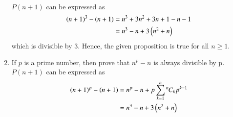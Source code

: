 \begin{enumerate}[label=\arabic*.,ref=\thesubsection.\theenumi]
		\\
		\solution $P(n+1)$ can be expressed as 
		\begin{align}
			\left(n+1\right)^3 -\left(n+1\right) &= n^3 + 3n^2 + 3n +1 -n -1
			\\
			&= n^3-n +3\left(n^2+n\right)
		\end{align}
		which is divisible by 3. Hence, the given proposition is true for all $n \ge 1$.
	\item If $p$ is a prime number, then prove that $n^p -n$ is always divisible by p.
\\
\solution $P(n+1)$ can be expressed as 
		\begin{align}
			\left(n+1\right)^p -\left(n+1\right) &= n^p  -n  + p \sum_{k=1}^{n}{{}^{n}\mkern-1muC_{k}}p^{k-1}
			\\
			&= n^3-n +3\left(n^2+n\right)
		\end{align}

\end{enumerate}
